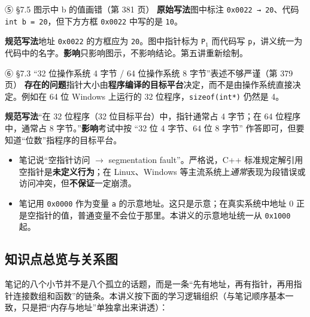\documentclass[UTF8,a4paper,11pt,fontset=none,zihao=-4]{ctexart}
\newcommand{\ci}[1]{{\circfont #1}}
\newcommand{\cpp}[1]{\lstinline[style=cpp,basicstyle=\ttfamily,numbers=none]{#1}}
\newcommand{\cc}[1]{\texttt{#1}}
\begin{document}
\begin{correctionbox}{\ci{⑤} §7.5 图示中 b 的值画错（第 381 页）}
\textbf{原始写法}\quad 图中标注 \cc{0x0022 → 20}、代码 \cc{int b = 20}，但下方方框 \cc{0x0022} 中写的是 \cc{10}。

\textbf{规范写法}\quad 地址 \cc{0x0022} 的方框应为 \cc{20}。图中指针标为 \cc{P$_1$} 而代码写 \cc{p}，讲义统一为代码中的名字。\quad\textbf{影响}\quad 只影响图示，不影响结论。第五讲重新绘制。
\end{correctionbox}

\begin{correctionbox}{\ci{⑥} §7.3 “32 位操作系统 4 字节 / 64 位操作系统 8 字节”表述不够严谨（第 379 页）}
\textbf{存在的问题}\quad 指针大小由\textbf{程序编译的目标平台}决定，而不是由操作系统直接决定。例如在 64 位 Windows 上运行的 32 位程序，\cpp{sizeof(int*)} 仍然是 4。

\textbf{规范写法}\quad “在 32 位程序（32 位目标平台）中，指针通常占 4 字节；在 64 位程序中，通常占 8 字节。”\quad\textbf{影响}\quad 考试中按 “32 位 4 字节、64 位 8 字节” 作答即可，但要知道“位数”指程序的目标平台。
\end{correctionbox}

\begin{warningbox}
\begin{itemize}
  \item 笔记说“空指针访问 $\to$ segmentation fault”。严格说，C++ 标准规定解引用空指针是\textbf{未定义行为}；在 Linux、Windows 等主流系统上\emph{通常}表现为段错误或访问冲突，但\textbf{不保证}一定崩溃。
  \item 笔记用 \cc{0x0000} 作为变量 \cc{a} 的示意地址。这只是示意；在真实系统中地址 0 正是空指针的值，普通变量不会位于那里。本讲义的示意地址统一从 \cc{0x1000} 起。
\end{itemize}
\end{warningbox}

\subsection*{知识点总览与关系图}
笔记的八个小节并不是八个孤立的话题，而是一条“先有地址，再有指针，再用指针连接数组和函数”的链条。本讲义按下面的学习逻辑组织（与笔记顺序基本一致，只是把“内存与地址”单独拿出来讲透）：
\end{document}

